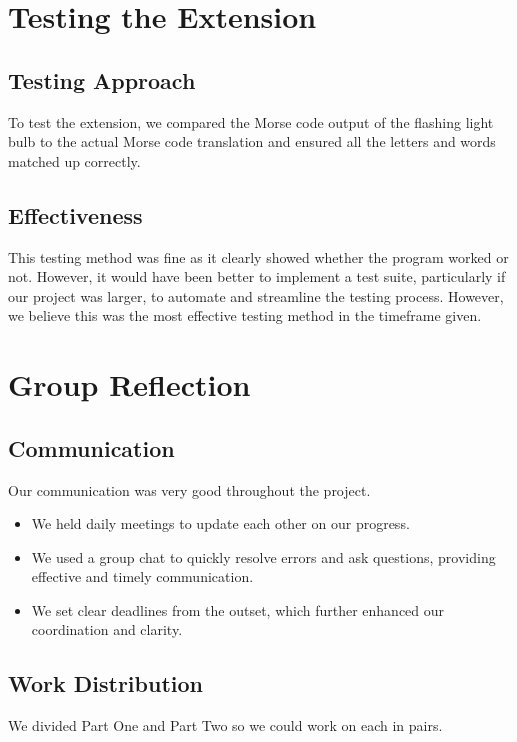 \documentclass{article}
\begin{document}
\section{Testing the Extension}
\label{sec:testing}
\subsection{Testing Approach}
To test the extension, we compared the Morse code output of the flashing light bulb to the actual Morse code translation and ensured all the letters and words matched up correctly.

\subsection{Effectiveness}
This testing method was fine as it clearly showed whether the program worked or not. However, it would have been better to implement a test suite, particularly if our project was larger, to automate and streamline the testing process. However, we believe this was the most effective testing method in the timeframe given.

\section{Group Reflection}
\label{sec:group_reflection}

\subsection{Communication}
Our communication was very good throughout the project. 

\begin{itemize}
    \item We held daily meetings to update each other on our progress.
    \item We used a group chat to quickly resolve errors and ask questions, providing effective and timely communication.
    \item We set clear deadlines from the outset, which further enhanced our coordination and clarity.
\end{itemize}

\subsection{Work Distribution}
We divided Part One and Part Two so we could work on each in pairs.
\end{document}
